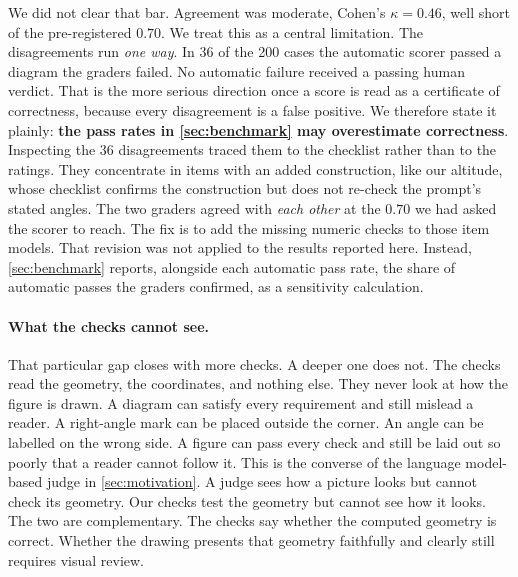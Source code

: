 We did not clear that bar. Agreement was moderate, Cohen's $\kappa = 0.46$, well short of the pre-registered $0.70$. We treat this as a central limitation. The disagreements run \emph{one way}. In 36 of the 200 cases the automatic scorer passed a diagram the graders failed. No automatic failure received a passing human verdict. That is the more serious direction once a score is read as a certificate of correctness, because every disagreement is a false positive. We therefore state it plainly: \textbf{the pass rates in \cref{sec:benchmark} may overestimate correctness}. Inspecting the 36 disagreements traced them to the checklist rather than to the ratings. They concentrate in items with an added construction, like our altitude, whose checklist confirms the construction but does not re-check the prompt's stated angles. The two graders agreed with \emph{each other} at the $0.70$ we had asked the scorer to reach. The fix is to add the missing numeric checks to those item models. That revision was not applied to the results reported here. Instead, \cref{sec:benchmark} reports, alongside each automatic pass rate, the share of automatic passes the graders confirmed, as a sensitivity calculation.

\paragraph{What the checks cannot see.}
That particular gap closes with more checks. A deeper one does not. The checks read the geometry, the coordinates, and nothing else. They never look at how the figure is drawn. A diagram can satisfy every requirement and still mislead a reader. A right-angle mark can be placed outside the corner. An angle can be labelled on the wrong side. A figure can pass every check and still be laid out so poorly that a reader cannot follow it. This is the converse of the language model-based judge in \cref{sec:motivation}. A judge sees how a picture looks but cannot check its geometry. Our checks test the geometry but cannot see how it looks. The two are complementary. The checks say whether the computed geometry is correct. Whether the drawing presents that geometry faithfully and clearly still requires visual review.
